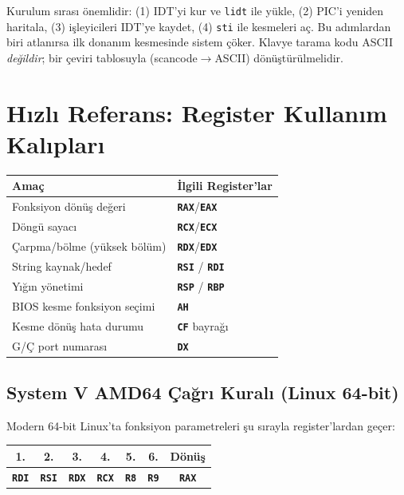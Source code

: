 \documentclass[11pt,a4paper]{article}
\newcommand{\reg}[1]{\texttt{\color{anaMavi}\textbf{#1}}}
\newcommand{\kod}[1]{\texttt{\color{koyuGri}#1}}
\begin{document}
\begin{bilgikutu}
Kurulum sırası önemlidir: (1) IDT'yi kur ve \kod{lidt} ile yükle, (2) PIC'i
yeniden haritala, (3) işleyicileri IDT'ye kaydet, (4) \kod{sti} ile kesmeleri
aç. Bu adımlardan biri atlanırsa ilk donanım kesmesinde sistem çöker. Klavye
tarama kodu ASCII \emph{değildir}; bir çeviri tablosuyla (scancode$\rightarrow$ASCII)
dönüştürülmelidir.
\end{bilgikutu}

\section{Hızlı Referans: Register Kullanım Kalıpları}

\begin{center}
\begin{tabularx}{\textwidth}{@{}>{\raggedright\arraybackslash}X l@{}}
\toprule
\rowcolor{anaMavi}\color{white}\textbf{Amaç} & \color{white}\textbf{İlgili Register'lar} \\
\midrule
Fonksiyon dönüş değeri & \reg{RAX}/\reg{EAX} \\
\rowcolor{acikGri} Döngü sayacı & \reg{RCX}/\reg{ECX} \\
Çarpma/bölme (yüksek bölüm) & \reg{RDX}/\reg{EDX} \\
\rowcolor{acikGri} String kaynak/hedef & \reg{RSI} / \reg{RDI} \\
Yığın yönetimi & \reg{RSP} / \reg{RBP} \\
\rowcolor{acikGri} BIOS kesme fonksiyon seçimi & \reg{AH} \\
Kesme dönüş hata durumu & \reg{CF} bayrağı \\
\rowcolor{acikGri} G/Ç port numarası & \reg{DX} \\
\bottomrule
\end{tabularx}
\end{center}

\subsection{System V AMD64 Çağrı Kuralı (Linux 64-bit)}

Modern 64-bit Linux'ta fonksiyon parametreleri şu sırayla register'lardan geçer:

\begin{center}
\begin{tabularx}{\textwidth}{@{}c c c c c c c@{}}
\toprule
\rowcolor{anaMavi}
\color{white}\textbf{1.} & \color{white}\textbf{2.} & \color{white}\textbf{3.} & \color{white}\textbf{4.} & \color{white}\textbf{5.} & \color{white}\textbf{6.} & \color{white}\textbf{Dönüş} \\
\midrule
\reg{RDI} & \reg{RSI} & \reg{RDX} & \reg{RCX} & \reg{R8} & \reg{R9} & \reg{RAX} \\
\bottomrule
\end{tabularx}
\end{center}
\end{document}
